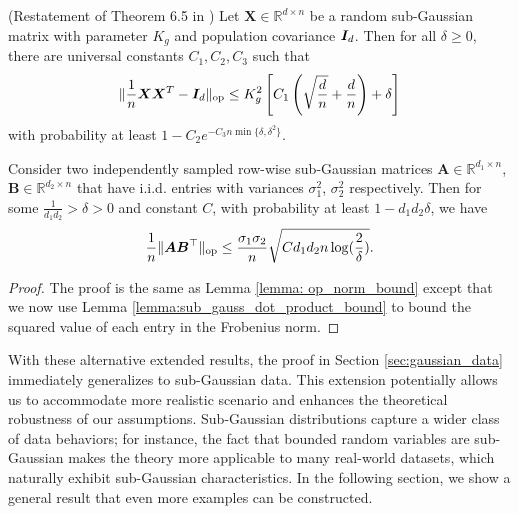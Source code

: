 \begin{lemma} (Restatement of Theorem 6.5 in \cite{wainwright2019high})\label{lemma:sub_gauss_cov_bound}
Let $\mathbf{X} \in \mathbb{R}^{d \times n}$ be a random sub-Gaussian matrix with parameter $K_g$ and population covariance ${\bm{I}}_d$. Then for all $\delta \geq 0$, there are universal constants $C_1, C_2, C_3$ such that 
\[
 \lVert \frac{1}{n}{\bm{X}}{\bm{X}}^T - {\bm{I}}_d \rVert_{\mathrm{op}} \leq K_g^2\left[ C_1\left(\sqrt{\frac{d}{n}}+\frac{d}{n}\right) + \delta\right]
\]
with probability at least $1 - C_2e^{-C_3n\min\{\delta, \delta^2\}}$. 
\end{lemma}

\begin{lemma} \label{lemma:sub_gauss_op_norm_bound}
    Consider two independently sampled row-wise sub-Gaussian matrices $\mathbf{A} \in \mathbb{R}^{d_1 \times n}$, $\mathbf{B} \in \mathbb{R}^{d_2 \times n}$ that have i.i.d. entries with variances $\sigma_1^2$, $\sigma_2^2$ respectively. Then for some $\frac{1}{d_1d_2} > \delta > 0$ and constant $C$, with probability at least $1- d_1d_2\delta$, we have
\[
    \frac{1}{n}\lVert {\bm{A}}{\bm{B}}^\top \rVert_{\mathrm{op}} \leq \frac{\sigma_1\sigma_2}{n}\sqrt{Cd_1d_2n\log(\frac{2}{\delta})}. 
\]
\end{lemma}

\begin{proof}
    The proof is the same as Lemma \ref{lemma: op_norm_bound} except that we now use Lemma \ref{lemma:sub_gauss_dot_product_bound} to bound the squared value of each entry in the Frobenius norm. 
\end{proof}

With these alternative extended results, the proof in Section \ref{sec:gaussian_data} immediately generalizes to sub-Gaussian data. This extension potentially allows us to accommodate more realistic scenario and enhances the theoretical robustness of our assumptions. Sub-Gaussian distributions capture a wider class of data behaviors; for instance, the fact that bounded random variables are sub-Gaussian makes the theory more applicable to many real-world datasets, which naturally exhibit sub-Gaussian characteristics. In the following section, we show a general result that even more examples can be constructed. 

